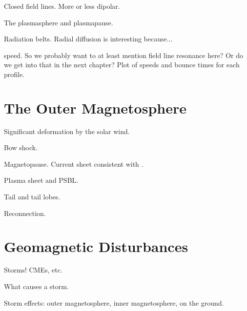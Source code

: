 Closed field lines. More or less dipolar. 

The plasmasphere and plasmapause. 

Radiation belts. Radial diffusion is interesting because... 

\Alfven speed. So we probably want to at least mention field line resonance here? Or do we get into that in the next chapter? Plot of \Alfven speeds and \Alfven bounce times for each profile. 

\section{The Outer Magnetosphere}

Significant deformation by the solar wind. 

Bow shock. 

Magnetopause. Current sheet consistent with \amplaw. 

Plasma sheet and PSBL. 

Tail and tail lobes. 

Reconnection. 

\section{Geomagnetic Disturbances}

Storms! CMEs, etc. 

What causes a storm. 

Storm effects: outer magnetosphere, inner magnetosphere, on the ground.













